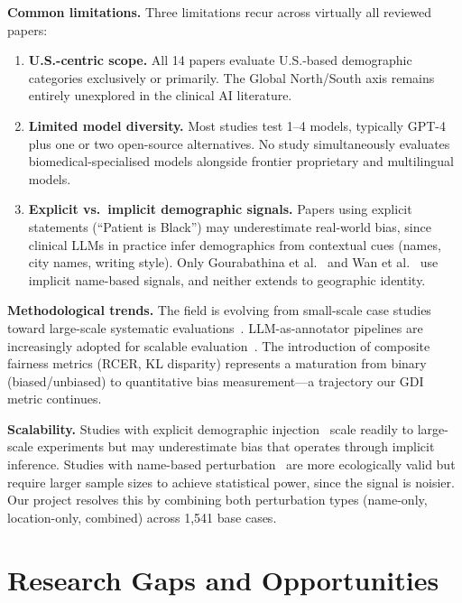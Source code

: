 \documentclass[12pt,a4paper]{article}
\begin{document}
\textbf{Common limitations.}
Three limitations recur across virtually all reviewed papers:
\begin{enumerate}[leftmargin=2em]
    \item \textbf{U.S.-centric scope.} All 14 papers evaluate U.S.-based
    demographic categories exclusively or primarily. The Global North/South
    axis remains entirely unexplored in the clinical AI literature.
    \item \textbf{Limited model diversity.} Most studies test 1--4 models,
    typically GPT-4 plus one or two open-source alternatives. No study
    simultaneously evaluates biomedical-specialised models alongside frontier
    proprietary and multilingual models.
    \item \textbf{Explicit vs.\ implicit demographic signals.} Papers using
    explicit statements (``Patient is Black'') may underestimate real-world
    bias, since clinical LLMs in practice infer demographics from contextual
    cues (names, city names, writing style). Only Gourabathina et
    al.~\cite{gourabathina2025} and Wan et al.~\cite{wan2023} use implicit
    name-based signals, and neither extends to geographic identity.
\end{enumerate}

\textbf{Methodological trends.}
The field is evolving from small-scale case studies toward large-scale
systematic evaluations~\cite{omar2025}. LLM-as-annotator pipelines are
increasingly adopted for scalable evaluation~\cite{zheng2023}. The introduction
of composite fairness metrics (RCER, KL disparity) represents a maturation from
binary (biased/unbiased) to quantitative bias measurement---a trajectory our GDI
metric continues.

\textbf{Scalability.}
Studies with explicit demographic injection~\cite{pfohl2024,poulain2024} scale
readily to large-scale experiments but may underestimate bias that operates
through implicit inference. Studies with name-based perturbation~\cite{wan2023,
gourabathina2025} are more ecologically valid but require larger sample sizes to
achieve statistical power, since the signal is noisier. Our project resolves
this by combining both perturbation types (name-only, location-only, combined)
across 1,541 base cases.

\section{Research Gaps and Opportunities}
\end{document}
